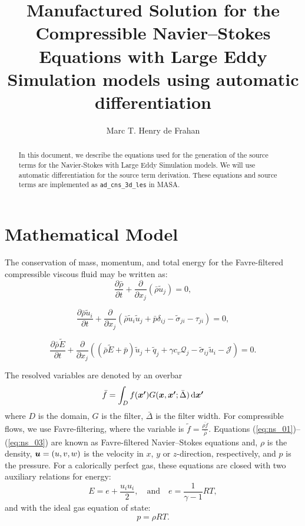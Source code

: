 \documentclass[10pt]{article}
\title{Manufactured Solution for the Compressible Navier--Stokes Equations with Large Eddy Simulation models using automatic differentiation}
\author{Marc T. Henry de Frahan}
\newcommand{\bv}[1]{\ensuremath{\mbox{\boldmath$ #1 $}}}
\newcommand{\pfrac}[2]{\frac{\partial#1}{\partial#2}}
\newcommand{\wt}[1]{\widetilde{#1}}
\newcommand{\ud}{\,\mathrm{d}}
\begin{document}
\maketitle

\begin{abstract}
  In this document, we describe the equations used for the generation
  of the source terms for the Navier-Stokes with Large Eddy Simulation
  models. We will use automatic differentiation for the source term
  derivation. These equations and source terms are implemented as
  \texttt{ad\_cns\_3d\_les} in MASA.
\end{abstract}

\section{Mathematical Model}
The conservation of mass, momentum, and total energy for the Favre-filtered compressible viscous fluid may be written as:
\begin{equation}
  \label{eq:ns_01}
  \pfrac{\bar{\rho}}{t} + \pfrac{}{x_j}\left( \bar{\rho} \wt{u}_j \right) = 0,
\end{equation}

\begin{equation}
  \label{eq:ns_02}
  \pfrac{\bar{\rho} \wt{u}_i}{t} + \pfrac{}{x_j}\left( \bar{\rho} \wt{u}_i \wt{u}_j + \bar{p} \delta_{ij} - \wt{\sigma}_{ji} - \tau_{ji} \right) = 0,
\end{equation}

\begin{equation}
  \label{eq:ns_03}
  \pfrac{\bar{\rho} \wt{E}}{t} + \pfrac{}{x_j}\left( \left(\bar{\rho} \wt{E} + \bar{p}\right) \wt{u}_j + \wt{q}_j + \gamma c_v \mathcal{Q}_j - \wt{\sigma}_{ij} \wt{u}_i - \mathcal{J} \right) = 0.
\end{equation}

The resolved variables are denoted by an overbar
\begin{equation}
  \bar{f} = \int_D f(\bv{x'}) G(\bv{x}, \bv{x'}; \bar{\Delta}) \ud \bv{x'}
\end{equation}
where $D$ is the domain, $G$ is the filter, $\bar{\Delta}$ is the
filter width. For compressible flows, we use Favre-filtering, where
the variable is $\wt{f} = \frac{\overline{\rho f}}{\bar{\rho}}$.
Equations (\ref{eq:ns_01})--(\ref{eq:ns_03}) are known as
Favre-filtered Navier--Stokes equations and, $\rho$ is the density,
$\bv{u}=(u,v,w)$ is the velocity in $x$, $y$ or $z$-direction,
respectively, and $p$ is the pressure. For a calorically perfect gas,
these equations are closed with two auxiliary relations for energy:
\begin{equation}
  \label{eq:ns_04}
  E = e + \dfrac{u_i u_i}{2},\quad\mbox{and}\quad e=\dfrac{1}{\gamma -1}RT ,
\end{equation}
and with the ideal gas equation of state:
\begin{equation}
  \label{eq:ns_05}
  p=\rho RT.
\end{equation}
\end{document}

